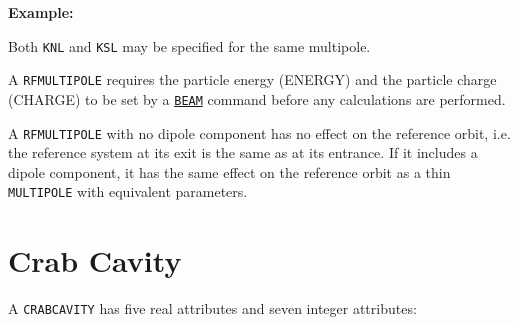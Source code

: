 {\bf Example:}

Both {\tt KNL} and {\tt KSL} may be specified for the same multipole.  

A {\tt RFMULTIPOLE} requires the particle energy (ENERGY) and the
particle charge (CHARGE) to be set by a \hyperref[sec:beam]{\tt BEAM}
command before any calculations are performed. 


A {\tt RFMULTIPOLE} with no dipole component has no effect on the reference
orbit, i.e. the reference system at its exit is the same as at its
entrance. If it includes a dipole component, it has the same effect on
the reference orbit as a thin {\tt MULTIPOLE} with equivalent
parameters. 




\section{Crab Cavity}
\label{sec:crab_cavity}\label{sec:crabcavity}



A {\tt CRABCAVITY} has five real attributes and seven integer attributes: 

